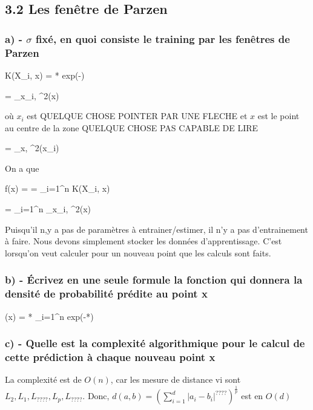 \documentclass[12pt]{article}
\newenvironment{eqs*}{\begin{equation*}\begin{aligned}}{\end{aligned}\end{equation*}}
\begin{document}
\subsection{3.2 Les fenêtre de Parzen}
\subsubsection{a) - $\sigma$ fixé, en quoi consiste le training par les fenêtres de Parzen}
\begin{eqs*}
	K(X_{i}, x) =  exp(-)
\end{eqs*}
\begin{eqs*}
	= _{x_{i}, \sigma^{2}}(x)
\end{eqs*}

où $x_{i}$ est QUELQUE CHOSE POINTER PAR UNE FLECHE et $x$ est le point au centre de la zone QUELQUE CHOSE PAS CAPABLE DE LIRE
\begin{eqs*}
	= _{x, \sigma^{2}}(x_{i})
\end{eqs*}

On a que
\begin{eqs*}
	f(x) =  = \sum_{i=1}^{n} K(X_{i}, x)
\end{eqs*}
\begin{eqs*}
	= \sum_{i=1}^{n} _{x_{i}, \sigma^{2}}(x)
\end{eqs*}

Puisqu'il n,y a pas de paramètres à entrainer/estimer, il n'y a pas d'entrainement à faire. Nous devons simplement stocker les données d'apprentissage.
C'est lorsqu'on veut calculer pour un nouveau point que les calculs sont faits.

\subsubsection{b) - Écrivez en une seule formule la fonction qui donnera la densité de probabilité prédite au point x}
\begin{eqs*}
	(x) = * \sum_{i=1}^{n} exp(-*)
\end{eqs*}

\subsubsection{c) - Quelle est la complexité algorithmique pour le calcul de cette prédiction à chaque nouveau point x}
La complexité est de $O(n)$, car les mesure de distance vi sont $L_{2},  L_{1},  L_{????},  L_{p},  L_{????}$.
Donc, $d(a,b) = (\sum_{i=1}^{d}|a_{i} - b_{i}|^{????})^{\frac{1}{p}}$ est en $O(d)$  
\end{document}
